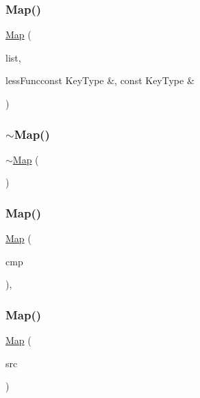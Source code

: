 \subsubsection{\texorpdfstring{Map()}{Map()}\hspace{0.1cm}{\footnotesize\ttfamily [6/8]}}
{\footnotesize\ttfamily \mbox{\hyperlink{classMap}{Map}} (\begin{DoxyParamCaption}\item[{std\+::initializer\+\_\+list$<$ std\+::pair$<$ Key\+Type, Value\+Type $>$ $>$}]{list,  }\item[{bool }]{less\+Funcconst Key\+Type \&, const Key\+Type \& }\end{DoxyParamCaption})}

\mbox{\label{classMap_ac59b12e62f61360298c324334ecc6bc9}} 
\subsubsection{\texorpdfstring{$\sim$\+Map()}{~Map()}}
{\footnotesize\ttfamily $\sim$\mbox{\hyperlink{classMap}{Map}} (\begin{DoxyParamCaption}{ }\end{DoxyParamCaption})\hspace{0.3cm}{\ttfamily [virtual]}}

\mbox{\label{classMap_a0f654fae6d97cd1f9b6420d00837eeeb}} 
\subsubsection{\texorpdfstring{Map()}{Map()}\hspace{0.1cm}{\footnotesize\ttfamily [7/8]}}
{\footnotesize\ttfamily \mbox{\hyperlink{classMap}{Map}} (\begin{DoxyParamCaption}\item[{Compare\+Type}]{cmp }\end{DoxyParamCaption})\hspace{0.3cm}{\ttfamily [inline]}, {\ttfamily [explicit]}}

\mbox{\label{classMap_a81c36bfbe9ece7606add9fc522cad3b2}} 
\subsubsection{\texorpdfstring{Map()}{Map()}\hspace{0.1cm}{\footnotesize\ttfamily [8/8]}}
{\footnotesize\ttfamily \mbox{\hyperlink{classMap}{Map}} (\begin{DoxyParamCaption}\item[{const \mbox{\hyperlink{classMap}{Map}}$<$ Key\+Type, Value\+Type $>$ \&}]{src }\end{DoxyParamCaption})\hspace{0.3cm}{\ttfamily [inline]}}



